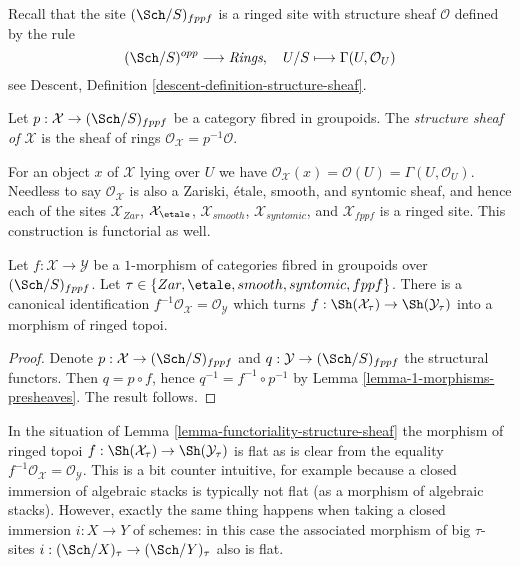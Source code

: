 \medskip\noindent
Recall that the site $(\Sch/S)_{fppf}$ is a ringed site
with structure sheaf $\mathcal{O}$ defined by the rule
$$
(\Sch/S)^{opp} \longrightarrow \textit{Rings},
\quad
U/S \longmapsto \Gamma(U, \mathcal{O}_U)
$$
see
Descent, Definition \ref{descent-definition-structure-sheaf}.

\begin{definition}
\label{definition-structure-sheaf}
Let $p : \mathcal{X} \to (\Sch/S)_{fppf}$ be a category
fibred in groupoids. The
{\it structure sheaf of $\mathcal{X}$} is the sheaf of rings
$\mathcal{O}_\mathcal{X} = p^{-1}\mathcal{O}$.
\end{definition}

\noindent
For an object $x$ of $\mathcal{X}$ lying over $U$ we have
$\mathcal{O}_\mathcal{X}(x) = \mathcal{O}(U) = \Gamma(U, \mathcal{O}_U)$.
Needless to say $\mathcal{O}_\mathcal{X}$ is also a Zariski, \'etale,
smooth, and syntomic sheaf, and hence each of the sites
$\mathcal{X}_{Zar}$, $\mathcal{X}_\etale$, $\mathcal{X}_{smooth}$,
$\mathcal{X}_{syntomic}$, and $\mathcal{X}_{fppf}$ is a ringed site.
This construction is functorial as well.

\begin{lemma}
\label{lemma-functoriality-structure-sheaf}
Let $f : \mathcal{X} \to \mathcal{Y}$ be a $1$-morphism of categories
fibred in groupoids over $(\Sch/S)_{fppf}$. Let
$\tau \in \{Zar, \etale, smooth, syntomic, fppf\}$.
There is a canonical identification
$f^{-1}\mathcal{O}_\mathcal{X} = \mathcal{O}_\mathcal{Y}$
which turns
$f : \Sh(\mathcal{X}_\tau) \to \Sh(\mathcal{Y}_\tau)$
into a morphism of ringed topoi.
\end{lemma}

\begin{proof}
Denote $p : \mathcal{X} \to (\Sch/S)_{fppf}$ and
$q : \mathcal{Y} \to (\Sch/S)_{fppf}$ the structural functors.
Then $q = p \circ f$, hence $q^{-1} = f^{-1} \circ p^{-1}$ by
Lemma \ref{lemma-1-morphisms-presheaves}.
The result follows.
\end{proof}

\begin{remark}
\label{remark-flat}
In the situation of
Lemma \ref{lemma-functoriality-structure-sheaf}
the morphism of ringed topoi
$f : \Sh(\mathcal{X}_\tau) \to \Sh(\mathcal{Y}_\tau)$
is flat as is clear from the equality
$f^{-1}\mathcal{O}_\mathcal{X} = \mathcal{O}_\mathcal{Y}$.
This is a bit counter intuitive, for example because a closed
immersion of algebraic stacks is typically not flat (as a morphism of
algebraic stacks).
However, exactly the same thing happens when taking a closed
immersion $i : X \to Y$ of schemes: in this case the associated
morphism of big $\tau$-sites
$i : (\Sch/X)_\tau \to (\Sch/Y)_\tau$
also is flat.
\end{remark}




